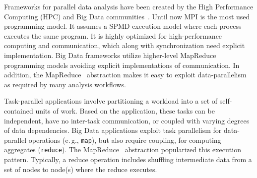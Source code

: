 \label{ch:data_hpc}

Frameworks for parallel data analysis have been created by the High Performance Computing (HPC) and Big Data communities~\cite{kamburugamuve2017anatomy}.
Until now MPI is the most used programming model.
It assumes a SPMD execution model where each process executes the same program.
It is highly optimized for high-performance computing and communication, which along with synchronization need explicit implementation.
Big Data frameworks utilize higher-level MapReduce~\cite{dean2004mapreduce} programming models avoiding explicit implementations of communication.
In addition, the MapReduce~\cite{dean2004mapreduce} abstraction makes it easy to exploit data-parallelism as required by many analysis workflows.

Task-parallel applications involve partitioning a workload into a set of self-contained units of work.
Based on the application, these tasks can be independent, have no inter-task communication, or coupled with varying degrees of data dependencies.
Big Data applications exploit task parallelism for data-parallel operations (e.\,g., \texttt{map}), but also require coupling, for computing aggregates (\texttt{reduce}).
The MapReduce~\cite{dean2004mapreduce} abstraction popularized this execution pattern.
Typically, a reduce operation includes shuffling intermediate data from a set of nodes to node(s) where the reduce executes.

